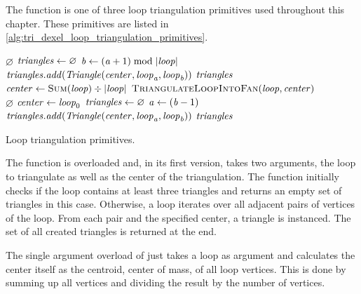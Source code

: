 The  function is one of three loop triangulation primitives used throughout this chapter.
These primitives are listed in \cref{alg:tri_dexel_loop_triangulation_primitives}.
%
\begin{algorithm}
	\centering
	\begin{algorithmic}[1]
				\State \Return $\varnothing$
			\EndIf
			\State $\mathit{triangles} \gets \varnothing$
				\State $\mathit{b} \gets (\mathit{a} + 1) \bmod |\mathit{loop}|$
				\State $\mathit{triangles}.\mathit{add}(\mathit{Triangle}(\mathit{center}, \mathit{loop}_{\mathit{a}}, \mathit{loop}_{\mathit{b}}))$
			\EndFor
			\State \Return $\mathit{triangles}$
		\EndFunction
		\\
			\State $\var{center} \gets \Call{Sum}{\var{loop}} \div |\var{loop}|$
			\State \Return $\Call{TriangulateLoopIntoFan}{\var{loop}, \var{center}}$
		\EndFunction
		\\
				\State \Return $\varnothing$
			\EndIf
			\State $\mathit{center} \gets \mathit{loop}_0$
			\State $\mathit{triangles} \gets \varnothing$
				\State $\mathit{a} \gets (\mathit{b} - 1)$
				\State $\mathit{triangles}.\mathit{add}(\mathit{Triangle}(\mathit{center}, \mathit{loop}_{\mathit{a}}, \mathit{loop}_{\mathit{b}}))$
			\EndFor
			\State \Return $\mathit{triangles}$
		\EndFunction
	\end{algorithmic}
	\caption{
		Loop triangulation primitives.
	}
	\label{alg:tri_dexel_loop_triangulation_primitives}
\end{algorithm}
%
The  function is overloaded and, in its first version, takes two arguments, the loop to triangulate as well as the center of the triangulation.
The function initially checks if the loop contains at least three triangles and returns an empty set of triangles in this case.
Otherwise, a loop iterates over all adjacent pairs of vertices of the loop.
From each pair and the specified center, a triangle is instanced.
The set of all created triangles is returned at the end.

The single argument overload of  just takes a loop as argument and calculates the center itself as the centroid, \ie center of mass, of all loop vertices.
This is done by summing up all vertices and dividing the result by the number of vertices.

